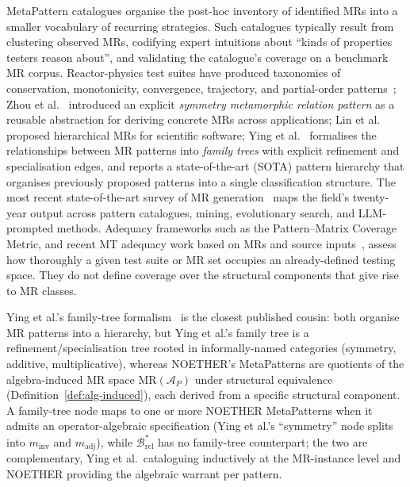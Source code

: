\documentclass[manuscript]{acmart}
\begin{document}
MetaPattern catalogues organise the post-hoc inventory of identified MRs into a smaller vocabulary of recurring strategies. Such catalogues typically result from clustering observed MRs, codifying expert intuitions about ``kinds of properties testers reason about'', and validating the catalogue's coverage on a benchmark MR corpus. Reactor-physics test suites have produced taxonomies of conservation, monotonicity, convergence, trajectory, and partial-order patterns~\cite{BellGlasstone1970, LewisMiller1993}; Zhou et al.~\cite{Zhou2020SymmetryMRP} introduced an explicit \emph{symmetry metamorphic relation pattern} as a reusable abstraction for deriving concrete MRs across applications; Lin et al.~\cite{Lin2018HierarchicalMR} proposed hierarchical MRs for scientific software; Ying et al.~\cite{Ying2025MRPatterns} formalises the relationships between MR patterns into \emph{family trees} with explicit refinement and specialisation edges, and reports a state-of-the-art (SOTA) pattern hierarchy that organises previously proposed patterns into a single classification structure. The most recent state-of-the-art survey of MR generation~\cite{LiTOSEM2025} maps the field's twenty-year output across pattern catalogues, mining, evolutionary search, and LLM-prompted methods. Adequacy frameworks such as the Pattern--Matrix Coverage Metric, and recent MT adequacy work based on MRs and source inputs~\cite{Fu2024MTAdequacy}, assess how thoroughly a given test suite or MR set occupies an already-defined testing space. They do not define coverage over the structural components that give rise to MR classes.

Ying et al.'s family-tree formalism~\cite{Ying2025MRPatterns} is the closest published cousin: both organise MR patterns into a hierarchy, but Ying et al.'s family tree is a refinement/specialisation tree rooted in informally-named categories (symmetry, additive, multiplicative), whereas NOETHER's MetaPatterns are quotients of the algebra-induced MR space $\mathrm{MR}(\mathcal{A}_P)$ under structural equivalence (Definition~\ref{def:alg-induced}), each derived from a specific structural component. A family-tree node maps to one or more NOETHER MetaPatterns when it admits an operator-algebraic specification (Ying et al.'s ``symmetry'' node splits into $m_{\mathrm{inv}}$ and $m_{\mathrm{adj}}$), while $\mathcal{B}^{*}_{\mathrm{rel}}$ has no family-tree counterpart; the two are complementary, Ying et al.\ cataloguing inductively at the MR-instance level and NOETHER providing the algebraic warrant per pattern.
\end{document}
